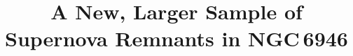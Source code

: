 %


\usepackage{natbib}
\usepackage{comment}
\usepackage{todonotes}
\usepackage{graphicx}



\title{A New, Larger Sample of Supernova Remnants in NGC\,6946}



